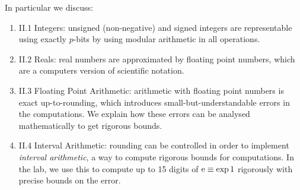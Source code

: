 \documentclass[12pt,a4paper]{book}
\theoremstyle{definition}
\begin{document}
In particular we discuss:

\begin{enumerate}
\item II.1 Integers: unsigned (non-negative) and signed integers are representable using exactly $p$-bits by using modular arithmetic in all operations.
\item II.2 Reals:  real numbers are approximated by floating point numbers, which are a computers version of scientific notation.
\item II.3 Floating Point Arithmetic:  arithmetic with floating point numbers is exact up-to-rounding, which introduces small-but-understandable errors in the computations. We explain how these errors can be analysed mathematically to get rigorous bounds. 
\item II.4 Interval Arithmetic: rounding can be controlled in order to implement {\it interval arithmetic}, a way to compute rigorous bounds for computations. In the lab, we use this to compute up to 15 digits of ${\rm e} \equiv \exp 1$ rigorously with precise bounds on the error.
\end{enumerate}






\end{document}
